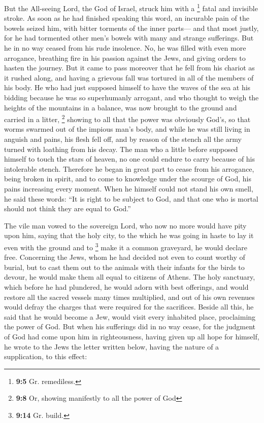  But the All-seeing Lord, the God of Israel, struck him
with a \footnote{\textbf{9:5} Gr. remediless.} fatal and invisible
stroke. As soon as he had finished speaking this word, an incurable pain
of the bowels seized him, with bitter torments of the inner parts---
 and that most justly, for he had tormented other men's
bowels with many and strange sufferings.  But he in no way
ceased from his rude insolence. No, he was filled with even more
arrogance, breathing fire in his passion against the Jews, and giving
orders to hasten the journey. But it came to pass moreover that he fell
from his chariot as it rushed along, and having a grievous fall was
tortured in all of the members of his body.  He who had
just supposed himself to have the waves of the sea at his bidding
because he was so superhumanly arrogant, and who thought to weigh the
heights of the mountains in a balance, was now brought to the ground and
carried in a litter, \footnote{\textbf{9:8} Or, showing manifestly to
  all the power of God} showing to all that the power was obviously
God's,  so that worms swarmed out of the impious man's
body, and while he was still living in anguish and pains, his flesh fell
off, and by reason of the stench all the army turned with loathing from
his decay.  The man who a little before supposed himself
to touch the stars of heaven, no one could endure to carry because of
his intolerable stench.  Therefore he began in great part
to cease from his arrogance, being broken in spirit, and to come to
knowledge under the scourge of God, his pains increasing every moment.
 When he himself could not stand his own smell, he said
these words: ``It is right to be subject to God, and that one who is
mortal should not think they are equal to God.''

 The vile man vowed to the sovereign Lord, who now no
more would have pity upon him, saying  that the holy
city, to the which he was going in haste to lay it even with the ground
and to \footnote{\textbf{9:14} Gr. build.} make it a common graveyard,
he would declare free.  Concerning the Jews, whom he had
decided not even to count worthy of burial, but to cast them out to the
animals with their infants for the birds to devour, he would make them
all equal to citizens of Athens.  The holy sanctuary,
which before he had plundered, he would adorn with best offerings, and
would restore all the sacred vessels many times multiplied, and out of
his own revenues would defray the charges that were required for the
sacrifices.  Beside all this, he said that he would
become a Jew, would visit every inhabited place, proclaiming the power
of God.  But when his sufferings did in no way cease, for
the judgment of God had come upon him in righteousness, having given up
all hope for himself, he wrote to the Jews the letter written below,
having the nature of a supplication, to this effect:

